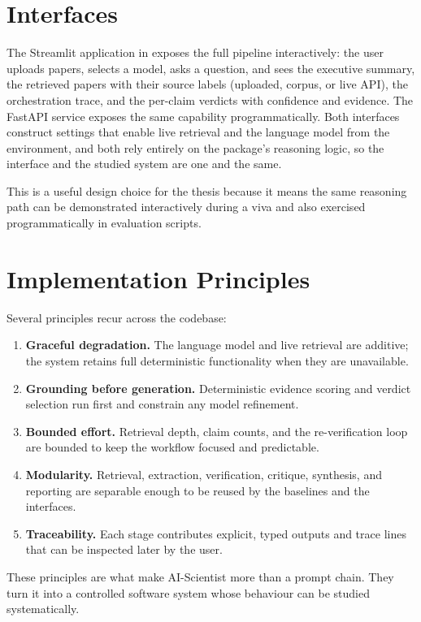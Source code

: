 \section{Interfaces }

The Streamlit application in  exposes the full pipeline interactively: the user uploads papers, selects
a model, asks a question, and sees the executive summary, the retrieved papers with their source labels (uploaded,
corpus, or live API), the orchestration trace, and the per-claim verdicts with confidence and evidence. The FastAPI
service exposes the same capability programmatically. Both interfaces construct settings that enable live retrieval
and the language model from the environment, and both rely entirely on the package's reasoning logic, so the
interface and the studied system are one and the same.

This is a useful design choice for the thesis because it means the same reasoning path can be demonstrated
interactively during a viva and also exercised programmatically in evaluation scripts.

\section{Implementation Principles }

Several principles recur across the codebase:

\begin{enumerate}
\item \textbf{Graceful degradation.} The language model and live retrieval are additive; the system retains full
deterministic functionality when they are unavailable.
\item \textbf{Grounding before generation.} Deterministic evidence scoring and verdict selection run first and
constrain any model refinement.
\item \textbf{Bounded effort.} Retrieval depth, claim counts, and the re-verification loop are bounded to keep the
workflow focused and predictable.
\item \textbf{Modularity.} Retrieval, extraction, verification, critique, synthesis, and reporting are separable
enough to be reused by the baselines and the interfaces.
\item \textbf{Traceability.} Each stage contributes explicit, typed outputs and trace lines that can be inspected
later by the user.
\end{enumerate}

These principles are what make AI-Scientist more than a prompt chain. They turn it into a controlled software
system whose behaviour can be studied systematically.


